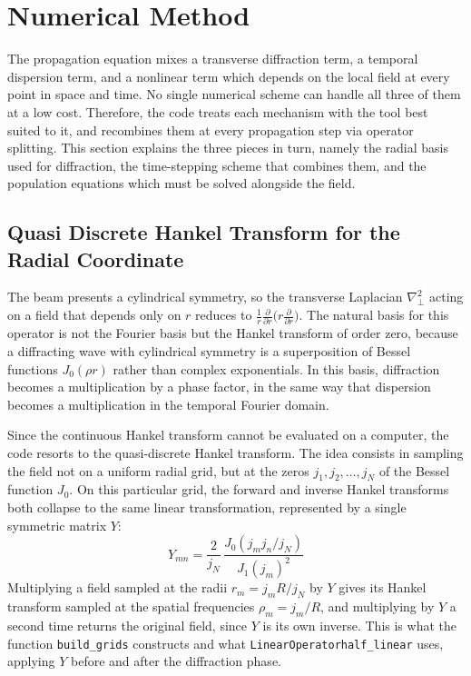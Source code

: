 \section{Numerical Method}

The propagation equation mixes a transverse diffraction term, a temporal dispersion term, and a nonlinear term which depends on the local field at every point in space and time. No single numerical scheme can handle all three of them at a low cost. Therefore, the code treats each mechanism with the tool best suited to it, and recombines them at every propagation step via operator splitting. This section explains the three pieces in turn, namely the radial basis used for diffraction, the time-stepping scheme that combines them, and the population equations which must be solved alongside the field.

\subsection{Quasi Discrete Hankel Transform for the Radial Coordinate}

The beam presents a cylindrical symmetry, so the transverse Laplacian $\nabla_\perp^2$ acting on a field that depends only on $r$ reduces to $\frac{1}{r}\frac{\partial}{\partial r}\big(r\frac{\partial}{\partial r}\big)$. The natural basis for this operator is not the Fourier basis but the Hankel transform of order zero, because a diffracting wave with cylindrical symmetry is a superposition of Bessel functions $J_0(\rho r)$ rather than complex exponentials. In this basis, diffraction becomes a multiplication by a phase factor, in the same way that dispersion becomes a multiplication in the temporal Fourier domain.

Since the continuous Hankel transform cannot be evaluated on a computer, the code resorts to the quasi-discrete Hankel transform. The idea consists in sampling the field not on a uniform radial grid, but at the zeros $j_1, j_2, \dots, j_N$ of the Bessel function $J_0$. On this particular grid, the forward and inverse Hankel transforms both collapse to the same linear transformation, represented by a single symmetric matrix $Y$:
\begin{equation}
Y_{mn} = \frac{2}{j_N}\,\frac{J_0(j_mj_n/j_N)}{J_1(j_m)^2}
\end{equation}
Multiplying a field sampled at the radii $r_m = j_m R/j_N$ by $Y$ gives its Hankel transform sampled at the spatial frequencies $\rho_m = j_m/R$, and multiplying by $Y$ a second time returns the original field, since $Y$ is its own inverse. This is what the function \texttt{build\_grids} constructs and what \texttt{LinearOperator\dotb half\_linear} uses, applying $Y$ before and after the diffraction phase.

